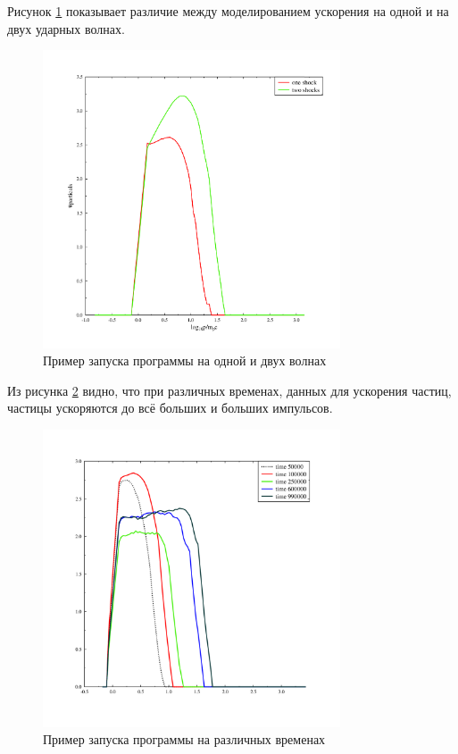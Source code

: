 \documentclass[a4paper,14pt]{extarticle} %
\begin{document}
Рисунок \ref{res/stoh/two} показывает различие между моделированием ускорения на одной и на двух ударных волнах.
\begin{figure}[!htb]
\centering
\includegraphics[width=250pt]{stoh_two_or_one}
\caption{Пример запуска программы на одной и двух волнах}
\label{res/stoh/two}
\end{figure}
Из рисунка \ref{res/stoh/times} видно, что при различных временах, данных для ускорения частиц, частицы ускоряются до всё больших и больших импульсов.
\begin{figure}[!htb]
\centering
\includegraphics[width=250pt]{stoh_times}
\caption{Пример запуска программы на различных временах}
\label{res/stoh/times}
\end{figure}
\end{document}
